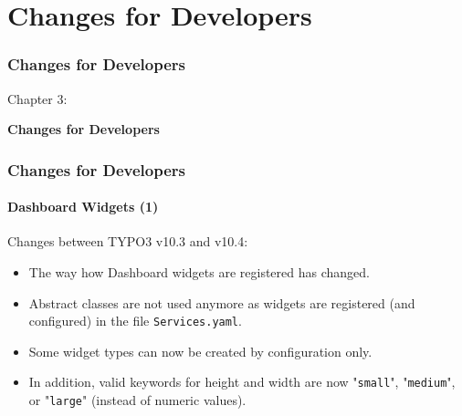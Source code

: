 %

\section{Changes for Developers}
\begin{frame}[fragile]
	\frametitle{Changes for Developers}

	\begin{center}\huge{Chapter 3:}\end{center}
	\begin{center}\huge{\color{typo3darkgrey}\textbf{Changes for Developers}}\end{center}

\end{frame}


\begin{frame}[fragile]
	\frametitle{Changes for Developers}
	\framesubtitle{Dashboard Widgets (1)}

	Changes between TYPO3 v10.3 and v10.4:

	\begin{itemize}
		\item The way how Dashboard widgets are registered has changed.
		\item Abstract classes are not used anymore as widgets are registered
			(and configured) in the file \texttt{Services.yaml}.
		\item Some widget types can now be created by configuration only.
		\item In addition, valid keywords for height and width are now
			"\texttt{small}", "\texttt{medium}", or "\texttt{large}"
			(instead of numeric values).
	\end{itemize}

\end{frame}



